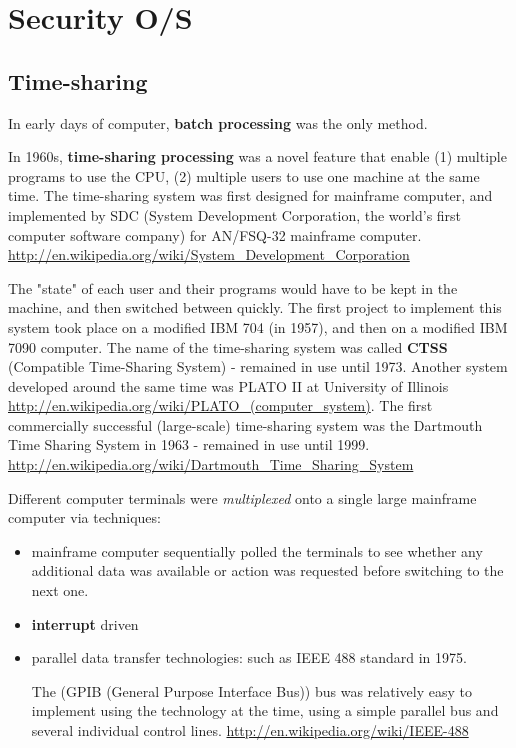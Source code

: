 \chapter{Security O/S}

\section{Time-sharing}

In early days of computer, {\bf batch processing} was the only method.

In 1960s, {\bf time-sharing processing} was a novel feature that enable (1)
multiple programs to use the CPU, (2) multiple users to use one machine at the
same time. The time-sharing system was first designed for mainframe computer,
and implemented by SDC (System Development Corporation, the world's first
computer software company) for AN/FSQ-32 mainframe computer.
\url{http://en.wikipedia.org/wiki/System_Development_Corporation}

The "state" of each user and their programs would have to be kept in the
machine, and then switched between quickly. The first project to implement this
system took place on a modified IBM 704 (in 1957), and then on a modified IBM
7090 computer. The name of the time-sharing system was called {\bf CTSS}
(Compatible Time-Sharing System) - remained in use until 1973. Another system
developed around the same time was PLATO II at University of Illinois
\url{http://en.wikipedia.org/wiki/PLATO_(computer_system)}.
The first commercially successful (large-scale) time-sharing system was the
Dartmouth Time Sharing System in 1963 - remained in use until 1999.
\url{http://en.wikipedia.org/wiki/Dartmouth_Time_Sharing_System}

Different computer terminals were {\it multiplexed} onto a single large
mainframe computer via techniques:
\begin{itemize}
  \item mainframe computer sequentially polled the terminals to see whether any
  additional data was available or action was requested before switching to the
  next one.
  
  \item {\bf interrupt} driven
  \item parallel data transfer technologies: such as IEEE 488 standard in
  1975.
  
  The (GPIB (General Purpose Interface Bus)) bus was relatively easy to
  implement using the technology at the time, using a simple parallel bus and
  several individual control lines.
  \url{http://en.wikipedia.org/wiki/IEEE-488}
  
\end{itemize}

